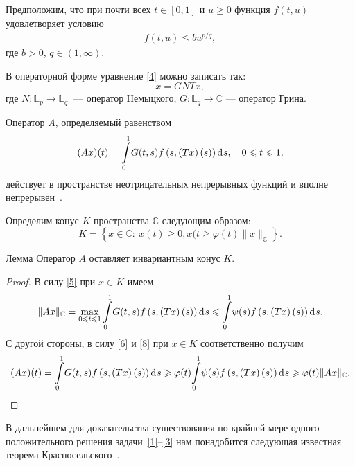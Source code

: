 \documentclass[press]{vestnik}
\begin{document}
Предположим, что при почти всех $t\in[0, 1]$ и $u\geqslant0$ функция $f(t,u)$ удовлетворяет условию
\begin{align}
f(t,u)\leqslant bu^{p/q}, \label{7}
\end{align}
где $b>0$, $q\in(1,\infty)$.

В операторной форме уравнение \eqref{4} можно записать так:
\[
x=GNTx,
\]
где $ N\colon \mathbb{L}_p \to \mathbb{L}_q\ $ --- оператор Немыцкого,  $ G\colon \mathbb{L}_q \to \mathbb{C}$ --- оператор Грина.

Оператор $A$, определяемый равенством
\begin{align*}
(Ax)(t)={\int\limits_{0}^{1}} G(t,s)f \left (s,\left(Tx \right)(s) \right)\d s,\quad 0\leqslant t\leqslant 1,
\end{align*}
действует в пространстве неотрицательных непрерывных функций и вполне непрерывен~\cite[, c.~161]{11}.

Определим конус $K$ пространства $\mathbb{C}$ следующим образом:
\[
K=\left\{x\in \mathbb{C}: \ x(t)\geqslant0, x(t\geqslant \varphi(t) \|x\|_{\mathbb{C}} \right\}.
\]

\begin{prop}[1]{Лемма} \label{lem-1}
Оператор $A$ оставляет инвариантным  конус $K$.
\end{prop}
\begin{proof}
В силу \eqref{5} при $x\in K$ имеем
\begin{equation}
\|Ax\|_{\mathbb{C}}=\max_{0\leqslant t\leqslant1}{\int\limits_{0}^{1}} G(t,s)f \left (s,\left(Tx \right)(s) \right)\d s \leqslant {\int\limits_{0}^{1}} \psi(s)f \left (s,\left(Tx \right)(s) \right)\d s. \label{8}
\end{equation}
С другой стороны, в силу \eqref{6} и \eqref{8} при $x\in K$ соответственно получим
\[
(Ax)(t)={\int\limits_{0}^{1}} G(t,s)f \left (s,\left(Tx \right)(s) \right)\d s\geqslant \varphi(t){\int\limits_{0}^{1}}\psi(s)f \left (s,\left(Tx \right)(s) \right)\d s\geqslant\varphi(t)\|Ax\|_{\mathbb{C}}.
\]
\end{proof}

В дальнейшем для доказательства существования по крайней мере одного положительного решения задачи~\eqref{1}--\eqref{3} нам понадобится следующая известная теорема Красносельского~\cite{12}.
\end{document}
